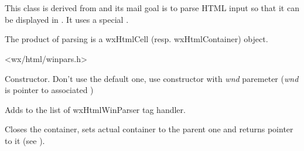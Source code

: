 %
%

\section{}\label{wxhtmlwinparser}

This class is derived from  and
its mail goal is to parse HTML input so that it can be displayed in
. It uses a special 
.


The product of parsing is a wxHtmlCell (resp. wxHtmlContainer) object.




<wx/html/winpars.h>




\label{wxhtmlwinparserwxhtmlwinparser}



Constructor. Don't use the default one, use constructor with
{\it wnd} paremeter ({\it wnd} is pointer to associated )

\label{wxhtmlwinparseraddmodule}


Adds  to the list of wxHtmlWinParser tag handler.

\label{wxhtmlwinparserclosecontainer}


Closes the container, sets actual container to the parent one
and returns pointer to it (see ).

\label{wxhtmlwinparsercreatecurrentfont}

